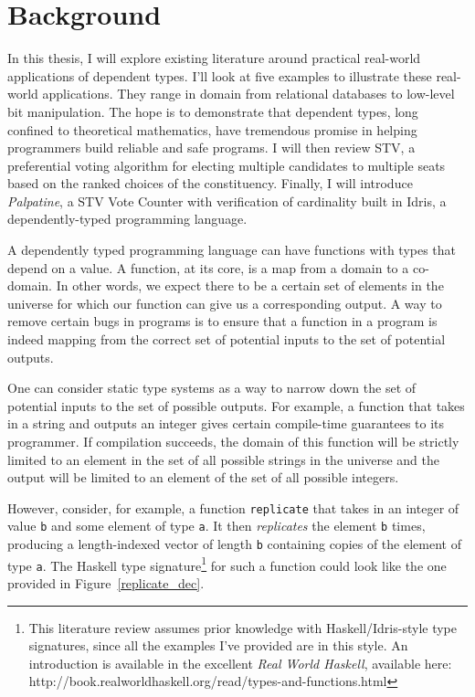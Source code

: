 \section{Background}
In this thesis, I will explore existing literature around practical real-world
applications of dependent types. I'll look at five examples to illustrate these
real-world applications. They range in domain from relational databases to
low-level bit manipulation. The hope is to demonstrate that dependent types,
long confined to theoretical mathematics, have tremendous promise in helping
programmers build reliable and safe programs. I will then review STV, a
preferential voting algorithm for electing multiple candidates to multiple seats
based on the ranked choices of the constituency. Finally, I will introduce
\textit{Palpatine}, a STV Vote Counter with verification of cardinality built in
Idris, a dependently-typed programming language. 

A dependently typed programming language can have functions with types that
depend on a value. A function, at its core, is a map from a domain to a
co-domain. In other words, we expect there to be a certain set of elements in
the universe for which our function can give us a corresponding output. A way to
remove certain bugs in programs is to ensure that a function in a program is
indeed mapping from the correct set of potential inputs to the set of potential
outputs. 

One can consider static type systems as a way to narrow down the set of
potential inputs to the set of possible outputs. For example, a function that
takes in a string and outputs an integer gives certain compile-time guarantees
to its programmer. If compilation succeeds, the domain of this function will be
strictly limited to an element in the set of all possible strings in the
universe and the output will be limited to an element of the set of all possible
integers. 

However, consider, for example, a function \texttt{replicate} that takes in an
integer of value \texttt{b} and some element of type \texttt{a}. It then
\textit{replicates} the element \texttt{b} times, producing a length-indexed
vector of length \texttt{b} containing copies of the element of type \texttt{a}.
The Haskell type signature\footnote{This literature review assumes prior
knowledge with Haskell/Idris-style type signatures, since all the examples I've
provided are in this style. An introduction is available in the excellent
\textit{Real World Haskell}, available here:
http://book.realworldhaskell.org/read/types-and-functions.html} for such a
function could look like the one provided in Figure~\ref{replicate_dec}.

